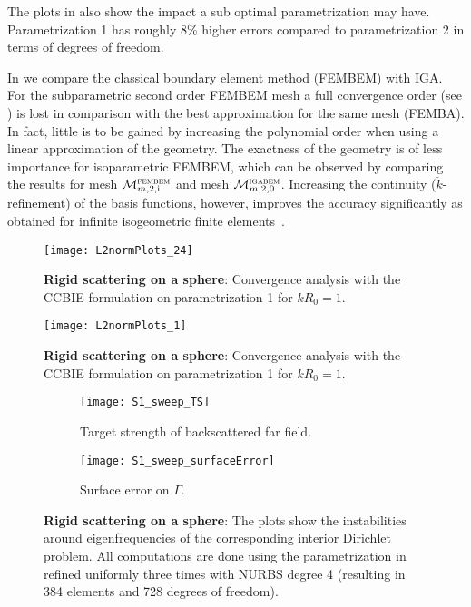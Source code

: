 The plots in  also show the impact a sub optimal parametrization may have. Parametrization 1 has roughly 8\% higher errors compared to parametrization 2 in terms of degrees of freedom.

In  we compare the classical boundary element method (FEMBEM) with IGA. For the subparametric second order FEMBEM mesh a full convergence order (see ) is lost in comparison with the best approximation for the same mesh (FEMBA). In fact, little is to be gained by increasing the polynomial order when using a linear approximation of the geometry. The exactness of the geometry is of less importance for isoparametric FEMBEM, which can be observed by comparing the results for mesh ${\cal M}_{m,2,\mathrm{i}}^{\textsc{fembem}}$ and mesh ${\cal M}_{m,2,0}^{\textsc{igabem}}$. Increasing the continuity ($\check{k}$-refinement) of the basis functions, however, improves the accuracy significantly as obtained for infinite isogeometric finite elements~\cite{Venas2018iao}.
\begin{figure}
	\centering
	\texttt{[image: L2normPlots\_24]}
	\caption{\textbf{Rigid scattering on a sphere}: Convergence analysis with the CCBIE formulation on parametrization 1 for $kR_0=1$.}
	\label{Fig3:convergenceAnalysis}
\end{figure}
\begin{figure}
	\centering
	\texttt{[image: L2normPlots\_1]}
	\caption{\textbf{Rigid scattering on a sphere}: Convergence analysis with the CCBIE formulation on parametrization 1 for $kR_0=1$.}
	\label{Fig3:convergenceAnalysis_nepw}
\end{figure}


\begin{figure}
	\centering
	\begin{subfigure}[t]{\textwidth}
		\texttt{[image: S1\_sweep\_TS]}
		\caption{Target strength of backscattered far field.}
		\label{Fig3:eigenFreqDirichlet}
	\end{subfigure} 
	\par\bigskip
	\par\bigskip
	\begin{subfigure}[t]{\textwidth}
		\texttt{[image: S1\_sweep\_surfaceError]}
		\caption{Surface error on $\Gamma$.}
		\label{Fig3:eigenFreqDirichletError}
	\end{subfigure} 
	\caption{\textbf{Rigid scattering on a sphere}: The plots show the instabilities around eigenfrequencies of the corresponding interior Dirichlet problem. All computations are done using the parametrization in  refined uniformly three times with NURBS degree 4 (resulting in 384 elements and 728 degrees of freedom).}
\end{figure}

